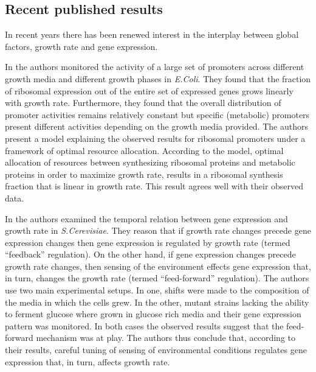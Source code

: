 \documentclass[a4page,notitlepage]{article}
\begin{document}
\subsection{Recent published results}
In recent years there has been renewed interest in the interplay between global factors, growth rate and gene expression.

In \parencite{Zaslaver2009a} the authors monitored the activity of a large set of promoters across different growth media and different growth phases in \emph{E.Coli}.
They found that the fraction of ribosomal expression out of the entire set of expressed genes grows linearly with growth rate.
Furthermore, they found that the overall distribution of promoter activities remains relatively constant but specific (metabolic) promoters present different activities depending on the growth media provided.
The authors present a model explaining the observed results for ribosomal promoters under a framework of optimal resource allocation.
According to the model, optimal allocation of resources between synthesizing ribosomal proteins and metabolic proteins in order to maximize growth rate, results in a ribosomal synthesis fraction that is linear in growth rate.
This result agrees well with their observed data.

In \parencite{Levy2009} the authors examined the temporal relation between gene expression and growth rate in \emph{S.Cerevisiae}.
They reason that if growth rate changes precede gene expression changes then gene expression is regulated by growth rate (termed ``feedback'' regulation).
On the other hand, if gene expression changes precede growth rate changes, then sensing of the environment effects gene expression that, in turn, changes the growth rate (termed ``feed-forward'' regulation).
The authors use two main experimental setups.
In one, shifts were made to the composition of the media in which the cells grew.
In the other, mutant strains lacking the ability to ferment glucose where grown in glucose rich media and their gene expression pattern was monitored.
In both cases the observed results suggest that the feed-forward mechanism was at play.
The authors thus conclude that, according to their results, careful tuning of sensing of environmental conditions regulates gene expression that, in turn, affects growth rate.
\end{document}

